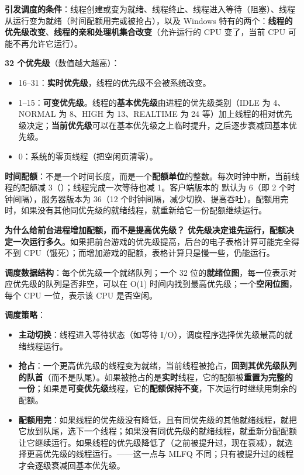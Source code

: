 \textbf{引发调度的条件}：线程创建或变为就绪、线程终止、线程进入等待（阻塞）、线程从运行变为就绪（时间配额用完或被抢占），以及 Windows 特有的两个：\textbf{线程的优先级改变}、\textbf{线程的亲和处理机集合改变}（允许运行的 CPU 变了，当前 CPU 可能不再允许它运行）。

\textbf{32 个优先级}（数值越大越高）：
\begin{itemize}
    \item 16–31：\textbf{实时优先级}，线程的优先级不会被系统改变。
    \item 1–15：\textbf{可变优先级}。线程的\textbf{基本优先级}由进程的优先级类别（IDLE 为 4、NORMAL 为 8、HIGH 为 13、REALTIME 为 24 等）加上线程的相对优先级决定；\textbf{当前优先级}可以在基本优先级之上临时提升，之后逐步衰减回基本优先级。
    \item 0：系统的零页线程（把空闲页清零）。
\end{itemize}

\textbf{时间配额}：不是一个时间长度，而是一个\textbf{配额单位}的整数。每次时钟中断，当前线程的配额减 3（）；线程完成一次等待也减 1。客户端版本的  默认为 6（即 2 个时钟间隔），服务器版本为 36（12 个时钟间隔，减少切换、提高吞吐）。配额用完时，如果没有其他同优先级的就绪线程，就重新给它一份配额继续运行。

\textbf{为什么给前台进程增加配额，而不是提高优先级？} \textbf{优先级决定谁先运行，配额决定一次运行多久}。如果把前台游戏的优先级提高，后台的电子表格计算可能完全得不到 CPU（饿死）；而增加游戏的配额，表格计算只是慢一些，仍能运行。

\textbf{调度数据结构}：每个优先级一个就绪队列；一个 32 位的\textbf{就绪位图}，每一位表示对应优先级的队列是否非空，可以在 O(1) 时间内找到最高优先级；一个\textbf{空闲位图}，每个 CPU 一位，表示该 CPU 是否空闲。

\textbf{调度策略}：
\begin{itemize}
    \item \textbf{主动切换}：线程进入等待状态（如等待 I/O），调度程序选择优先级最高的就绪线程运行。
    \item \textbf{抢占}：一个更高优先级的线程变为就绪，当前线程被抢占，\textbf{回到其优先级队列的队首}（而不是队尾）。如果被抢占的是\textbf{实时}线程，它的配额被\textbf{重置为完整的一份}；如果是\textbf{可变优先级}线程，它的\textbf{配额保持不变}，下次运行时继续用剩余的配额。
    \item \textbf{配额用完}：如果线程的优先级没有降低，且有同优先级的其他就绪线程，就把它放到队尾，选下一个线程；如果没有同优先级的就绪线程，就重新分配配额让它继续运行。如果线程的优先级降低了（之前被提升过，现在衰减），就选择更高优先级的线程运行。\ez {}——这一点与 MLFQ 不同；只有被提升过的线程才会逐级衰减回基本优先级。
\end{itemize}

